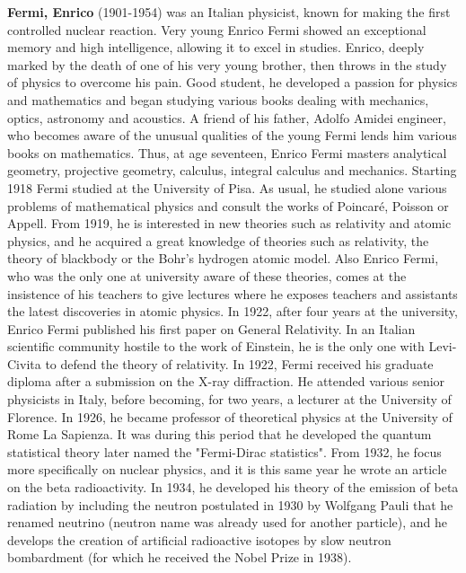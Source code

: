 \textbf{Fermi, Enrico} (1901-1954) was an Italian physicist, known for making the first controlled nuclear reaction. Very young Enrico Fermi showed an exceptional memory and high intelligence, allowing it to excel in studies. Enrico, deeply marked by the death of one of his very young brother, then throws in the study of physics to overcome his pain. Good student, he developed a passion for physics and mathematics and began studying various books dealing with mechanics, optics, astronomy and acoustics. A friend of his father, Adolfo Amidei engineer, who becomes aware of the unusual qualities of the young Fermi lends him various books on mathematics. Thus, at age seventeen, Enrico Fermi masters analytical geometry, projective geometry, calculus, integral calculus and mechanics. Starting 1918 Fermi studied at the University of Pisa. As usual, he studied alone various problems of mathematical physics and consult the works of Poincaré, Poisson or Appell. From 1919, he is interested in new theories such as relativity and atomic physics, and he acquired a great knowledge of theories such as relativity, the theory of blackbody or the Bohr's hydrogen atomic model. Also Enrico Fermi, who was the only one at university aware of these theories, comes at the insistence of his teachers to give lectures where he exposes teachers and assistants the latest discoveries in atomic physics. In 1922, after four years at the university, Enrico Fermi published his first paper on General Relativity. In an Italian scientific community hostile to the work of Einstein, he is the only one with Levi-Civita to defend the theory of relativity. In 1922, Fermi received his graduate diploma after a submission on the X-ray diffraction. He attended various senior physicists in Italy, before becoming, for two years, a lecturer at the University of Florence. In 1926, he became professor of theoretical physics at the University of Rome La Sapienza. It was during this period that he developed the quantum statistical theory later named the "Fermi-Dirac statistics". From 1932, he focus more specifically on nuclear physics, and it is this same year he wrote an article on the beta radioactivity. In 1934, he developed his theory of the emission of beta radiation by including the neutron postulated in 1930 by Wolfgang Pauli that he renamed neutrino (neutron name was already used for another particle), and he develops the creation of artificial radioactive isotopes by slow neutron bombardment (for which he received the Nobel Prize in 1938).

